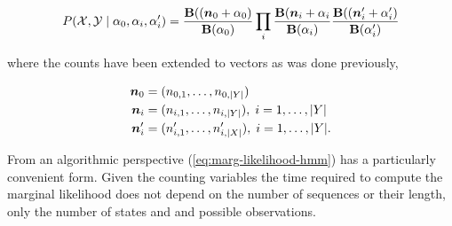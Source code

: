 \documentclass[12pt]{report}
\newcommand{\p}[0]{\prime}
\newcommand{\1}[0]{\mathbbm{1}}
\newcommand{\Bf}[0]{\text{\textbf{B}}}
\DeclarePairedDelimiter\abs{\lvert}{\rvert}%
\begin{document}
\begin{equation}
    P(\mathcal{X}, \mathcal{Y} \mid \alpha_0, \alpha_i, \alpha_i^\prime)
    = \frac{\Bf((\bm{n}_0 + \alpha_0)}{\Bf(\alpha_0)}
    \prod_i \frac{\Bf{(\bm{n}_i + \alpha_i}}{\Bf(\alpha_i)}
    \frac{\Bf((\bm{n}_i^\p + \alpha_i^\p)}{\Bf(\alpha_i^\p)}
    \label{eq:marg-likelihood-hmm}
\end{equation}

where the counts have been extended to vectors as was done previously,

\begin{align*}
    \bm{n}_0 &= (n_{0,1}, \ldots, n_{0,\abs{Y}}) \\
    \bm{n}_i &= (n_{i,1}, \ldots, n_{i,\abs{Y}}),\; i = 1, \ldots, \abs{Y} \\
    \bm{n}_i^\p &= (n_{i,1}^\p, \ldots, n_{i,\abs{X}}^\p),\; i = 1, \ldots, \abs{Y}. \\
\end{align*}

From an algorithmic perspective (\ref{eq:marg-likelihood-hmm}) has a particularly convenient
form. Given the counting variables the time required to compute the marginal likelihood does not
depend on the number of sequences or their length, only the number of states and and possible observations.
\end{document}
